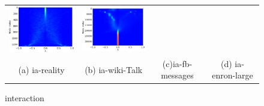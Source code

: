 \documentclass[senior,final,11pt]{iscs-thesis}
\begin{document}
\begin{figure}[htbp]
\begin{tabular}{cccc}
    \includegraphics[width=45mm]{figure/ia-fb-messagesmtx_pdos.png} &
    \includegraphics[width=45mm]{figure/ia-enron-largemtx_pdos.png} \\
    (a) ia-reality & (b) ia-wiki-Talk & (c)ia-fb-messages  & (d) ia-enron-large\\ [6pt]
  \end{tabular}
  \caption{interaction}
  \label{fig:interaction }
\end{figure}
\end{document}
